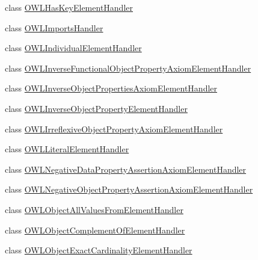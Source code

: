 \begin{DoxyCompactItemize}
\item 
class \hyperlink{classorg_1_1coode_1_1owlapi_1_1owlxmlparser_1_1_o_w_l_has_key_element_handler}{O\-W\-L\-Has\-Key\-Element\-Handler}
\item 
class \hyperlink{classorg_1_1coode_1_1owlapi_1_1owlxmlparser_1_1_o_w_l_imports_handler}{O\-W\-L\-Imports\-Handler}
\item 
class \hyperlink{classorg_1_1coode_1_1owlapi_1_1owlxmlparser_1_1_o_w_l_individual_element_handler}{O\-W\-L\-Individual\-Element\-Handler}
\item 
class \hyperlink{classorg_1_1coode_1_1owlapi_1_1owlxmlparser_1_1_o_w_l_inverse_functional_object_property_axiom_element_handler}{O\-W\-L\-Inverse\-Functional\-Object\-Property\-Axiom\-Element\-Handler}
\item 
class \hyperlink{classorg_1_1coode_1_1owlapi_1_1owlxmlparser_1_1_o_w_l_inverse_object_properties_axiom_element_handler}{O\-W\-L\-Inverse\-Object\-Properties\-Axiom\-Element\-Handler}
\item 
class \hyperlink{classorg_1_1coode_1_1owlapi_1_1owlxmlparser_1_1_o_w_l_inverse_object_property_element_handler}{O\-W\-L\-Inverse\-Object\-Property\-Element\-Handler}
\item 
class \hyperlink{classorg_1_1coode_1_1owlapi_1_1owlxmlparser_1_1_o_w_l_irreflexive_object_property_axiom_element_handler}{O\-W\-L\-Irreflexive\-Object\-Property\-Axiom\-Element\-Handler}
\item 
class \hyperlink{classorg_1_1coode_1_1owlapi_1_1owlxmlparser_1_1_o_w_l_literal_element_handler}{O\-W\-L\-Literal\-Element\-Handler}
\item 
class \hyperlink{classorg_1_1coode_1_1owlapi_1_1owlxmlparser_1_1_o_w_l_negative_data_property_assertion_axiom_element_handler}{O\-W\-L\-Negative\-Data\-Property\-Assertion\-Axiom\-Element\-Handler}
\item 
class \hyperlink{classorg_1_1coode_1_1owlapi_1_1owlxmlparser_1_1_o_w_l_negative_object_property_assertion_axiom_element_handler}{O\-W\-L\-Negative\-Object\-Property\-Assertion\-Axiom\-Element\-Handler}
\item 
class \hyperlink{classorg_1_1coode_1_1owlapi_1_1owlxmlparser_1_1_o_w_l_object_all_values_from_element_handler}{O\-W\-L\-Object\-All\-Values\-From\-Element\-Handler}
\item 
class \hyperlink{classorg_1_1coode_1_1owlapi_1_1owlxmlparser_1_1_o_w_l_object_complement_of_element_handler}{O\-W\-L\-Object\-Complement\-Of\-Element\-Handler}
\item 
class \hyperlink{classorg_1_1coode_1_1owlapi_1_1owlxmlparser_1_1_o_w_l_object_exact_cardinality_element_handler}{O\-W\-L\-Object\-Exact\-Cardinality\-Element\-Handler}

\end{DoxyCompactItemize}
